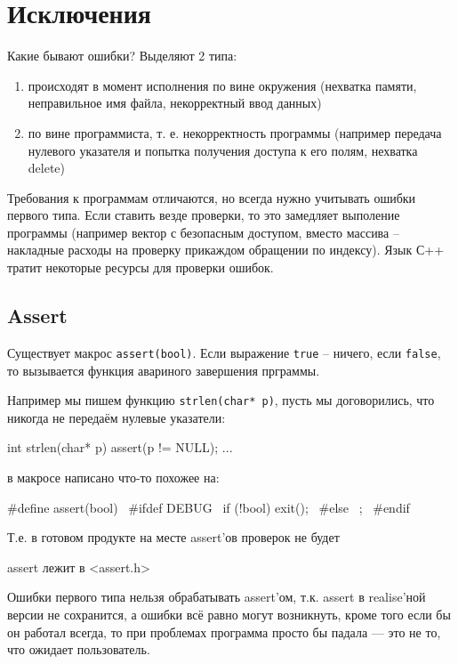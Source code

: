 \section{Исключения}

Какие бывают ошибки? Выделяют 2 типа:
\begin{enumerate}
	\item происходят в момент исполнения по вине окружения (нехватка памяти, неправильное имя файла, некорректный ввод данных)
	\item по вине программиста, т. е. некорректность программы (например передача нулевого указателя и попытка получения доступа к его полям, нехватка delete)
\end{enumerate}

Требования к программам отличаются, но всегда нужно учитывать ошибки первого типа. Если ставить везде проверки, то это замедляет выполение программы (например вектор с безопасным доступом, вместо массива – накладные расходы на проверку прикаждом обращении по индексу). Язык С++ тратит некоторые ресурсы для проверки ошибок.

\subsection{Assert}

Существует макрос \texttt{assert(bool)}. Если выражение \texttt{true} – ничего, если \texttt{false}, то вызывается функция авариного завершения прграммы.

Например мы пишем функцию \texttt{strlen(char* p)}, пусть мы договорились, что никогда не передаём нулевые указатели:

\begin{cppcode}
int strlen(char* p) {
    assert(p != NULL);
    ...
}
\end{cppcode}

в макросе написано что-то похожее на:
\begin{cppcode}
#define assert(bool) \
#ifdef DEBUG \
if (!bool) exit(); \
#else \
; \
#endif
\end{cppcode}

Т.е. в готовом продукте на месте assert'ов проверок не будет

\begin{Rem}
	assert лежит в <assert.h>
\end{Rem}

Ошибки первого типа нельзя обрабатывать assert'ом, т.к. assert в realise'ной версии не сохранится, а ошибки всё равно могут возникнуть, кроме того если бы он работал всегда, то при проблемах программа просто бы падала --- это не то, что ожидает пользователь.


